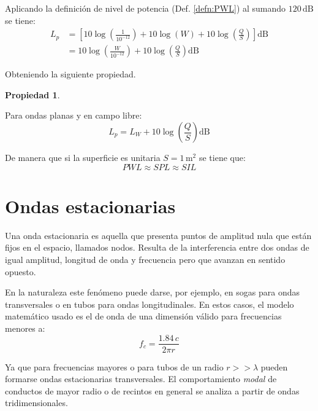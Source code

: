 \documentclass[a5paper,12pt,twoside]{book}
\newtheorem{prop}{{Propiedad}}[chapter]
\begin{document}
Aplicando la definición de nivel de potencia (Def. \ref{defn:PWL}) al sumando $120\,\si{\deci\bel}$ se tiene:
\begin{align*}
    L_p &= \left[ 10 \log \left( \frac{1}{10^{-12}} \right) + 10 \log(W) + 10 \log \left( \frac{Q}{S} \right) \right] \si{\deci\bel}
    \\
    &= 10 \log \left( \frac{W}{10^{-12}} \right) + 10 \log \left( \frac{Q}{S} \right) \si{\deci\bel}
\end{align*}

Obteniendo la siguiente propiedad.

\begin{mdframed}[style=MyFrame1]
    \begin{prop}
    \end{prop}
    Para ondas planas y en campo libre:
    \begin{equation*}
        L_p = L_W + 10 \log \left( \frac{Q}{S} \right) \si{\deci\bel}
    \end{equation*}
\end{mdframed}

De manera que si la superficie es unitaria $S=1\,\si{\metre^2}$ se tiene que:
\begin{equation*}
    PWL \approx SPL \approx SIL
\end{equation*}


\chapter{Ondas estacionarias}
\label{cha:standingWaves}

Una onda estacionaria es aquella que presenta puntos de amplitud nula que están fijos en el espacio, llamados nodos.
Resulta de la interferencia entre dos ondas de igual amplitud, longitud de onda y frecuencia pero que avanzan en sentido opuesto.

En la naturaleza este fenómeno puede darse, por ejemplo, en sogas para ondas transversales o en tubos para ondas longitudinales.
En estos casos, el modelo matemático usado es el de onda de una dimensión válido para frecuencias menores a:
\begin{equation*}
    f_c = \frac{1.84 \, c}{2\pi r}
\end{equation*}

Ya que para frecuencias mayores o para tubos de un radio $r>>\lambda$ pueden formarse ondas estacionarias transversales.
El comportamiento \emph{modal} de conductos de mayor radio o de recintos en general se analiza a partir de ondas tridimensionales.
\end{document}
